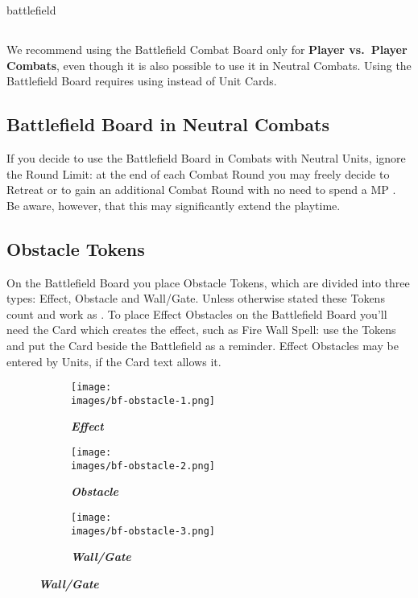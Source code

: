 \begin{expansion}{battlefield}
  \begin{multicols*}{2}
  \subsection*{}
  We recommend using the Battlefield Combat Board only for \textbf{Player vs.~Player Combats}, even though it is also possible to use it in Neutral Combats.
  Using the Battlefield Board requires using  instead of Unit Cards.

  \medskip
  \subsection*{Battlefield Board in Neutral Combats}
  If you decide to use the Battlefield Board in Combats with Neutral Units, ignore the Round Limit:
  at the end of each Combat Round you may freely decide to Retreat or to gain an additional Combat Round with no need to spend a MP .
  Be aware, however, that this may significantly extend the playtime.

  \medskip
  \subsection*{Obstacle Tokens}
  On the Battlefield Board you place Obstacle Tokens, which are divided into three types:
  Effect, Obstacle and Wall/Gate.
  Unless otherwise stated these Tokens count and work as .
  To place Effect Obstacles on the Battlefield Board you'll need the Card which creates the effect, such as Fire Wall Spell: use the Tokens and put the Card beside the Battlefield as a reminder.
  Effect Obstacles may be entered by Units, if the Card text allows it.
  \vspace*{1em}
  \begin{figure}[H]
    \centering
    \begin{subfigure}[b]{0.3\linewidth}
      \centering
      \texttt{[image: \\images/bf-obstacle-1.png]}
      \caption{\textbf{\textit{\textcolor{darkcandyapplered}{Effect}}}}
    \end{subfigure}
    \begin{subfigure}[b]{0.3\linewidth}
      \centering
      \texttt{[image: \\images/bf-obstacle-2.png]}
      \caption{\textbf{\textit{\textcolor{darkcandyapplered}{Obstacle}}}}
    \end{subfigure}
    \begin{subfigure}[b]{0.3\linewidth}
      \centering
      \texttt{[image: \\images/bf-obstacle-3.png]}
      \caption{\textbf{\textit{\textcolor{darkcandyapplered}{Wall/Gate}}}}
    \end{subfigure}
  \end{figure}
  \vspace*{1em}
  \columnbreak


\end{multicols*}
\end{expansion}
